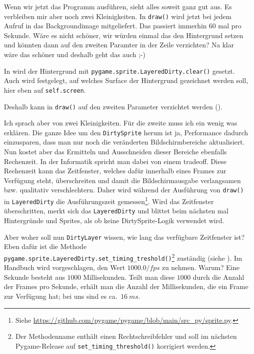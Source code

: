 

Wenn wir jetzt das Programm ausführen, sieht alles soweit ganz gut aus. Es verbleiben mir aber noch zwei Kleinigkeiten. In \texttt{draw()} wird jetzt bei jedem Aufruf in  das Backgroundimage mitgeliefert. Das passiert immerhin 60 mal pro Sekunde. Wäre es nicht schöner, wir würden einmal das den Hintergrund setzen und könnten dann auf den zweiten Paramter in der Zeile verzichten? Na klar wäre das schöner und deshalb geht das auch ;-)

In  wird der Hintergrund mit \texttt{pygame.sprite.LayeredDirty.clear()} gesetzt. Auch wird festgelegt, auf welches Surface der Hintergrund gezeichnet werden soll, hier eben auf \texttt{self.screen}.


Deshalb kann in \texttt{draw()} auf den zweiten Parameter verzichtet werden ().


Ich sprach aber von zwei Kleinigkeiten. Für die zweite muss ich ein wenig was erklären. Die ganze Idee um den \texttt{DirtySprite} herum ist ja, Performance dadurch einzusparen, dass man nur noch die veränderten Bildschirmbereiche aktualisiert. Nun kostet aber das Ermitteln und Ausschneiden dieser Bereiche ebenfalls Rechenzeit. In der Informatik spricht man dabei von einem \gls{tradeoff}. Diese Rechenzeit kann das Zeitfenster, welches dafür innerhalb eines Frames zur Verfügung steht, überschreiten und damit die Bildschirmausgabe verlangsamen bzw. qualitativ verschlechtern. Daher wird während der Ausführung von \texttt{draw()} in \texttt{LayeredDirty} die Ausführungszeit gemessen\footnote{Siehe \url{https://github.com/pygame/pygame/blob/main/src_py/sprite.py}.}. Wird das Zeitfenster überschritten, merkt sich das \texttt{LayeredDirty} und blittet beim nächsten mal Hintergründe und Sprites, als ob keine DirtySprite-Logik verwendet wird. 

Aber woher soll nun \texttt{DirtyLayer} wissen, wie lang das verfügbare Zeitfenster ist? Eben dafür ist die Methode \texttt{pygame.sprite.LayeredDirty.set\-\_tim\-ing\-\_tres\-hold()}\footnote{Der Methodenname enthält einen Rechtschreibfehler und soll im nächsten Pygame-Release auf \texttt{set\_timing\_threshold()} korrigiert werden.} zuständig (siehe ). Im Handbuch wird vorgeschlagen, den Wert $1000.0 / fps$ zu nehmen. Warum? Eine Sekunde besteht aus $1000$ Millisekunden. Teilt man diese $1000$ durch die Anzahl der Frames pro Sekunde, erhält man die Anzahl der Millisekunden, die ein Frame zur Verfügung hat; bei uns sind es ca.~$16~ms$.

